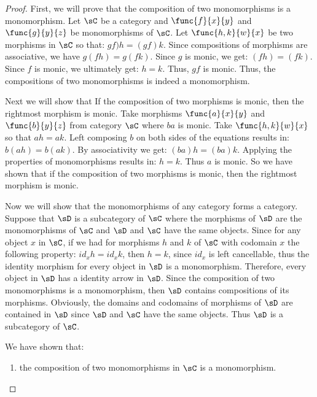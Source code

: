 \documentclass[main.tex]{subfiles}
\begin{document}
\begin{proof}
	First, we will prove that the composition of two monomorphisms is a
	monomorphism. Let \(\sC\) be a category and \(\func{f}{x}{y}\) and
	\(\func{g}{y}{z}\) be monomorphisms of \(\sC\). Let \(\func{h,k}{w}{x}\) be
	two morphisms in \(\sC\) so that: \(gf)h=(gf)k\). Since compositions of
	morphisms are associative, we have \(g(fh)=g(fk)\). Since \(g\) is monic, we
	get: \((fh)=(fk)\). Since \(f\) is monic, we ultimately get: \(h=k\). Thus,
	\(gf\) is monic. Thus, the compositions of two monomorphisms is indeed a
	monomorphism.

	Next we will show that If the composition of two morphisms is monic, then
	the rightmost morphism is monic. Take morphisms \(\func{a}{x}{y}\) and
	\(\func{b}{y}{z}\) from category \(\sC\) where \(ba\) is monic. Take
	\(\func{h,k}{w}{x}\) so that \(ah=ak\). Left composing \(b\) on both sides
	of the equations results in: \(b(ah)=b(ak)\). By associativity we get:
	\((ba)h=(ba)k\). Applying the properties of monomorphisms results in:
	\(h=k\). Thus \(a\) is monic. So we have shown that if the composition of two
	morphisms is monic, then the rightmost morphism is monic.

	Now we will show that the monomorphisms of any category forms a category.
	Suppose that \(\sD\) is a subcategory of \(\sC\) where the morphisms of
	\(\sD\) are the monomorphisms of \(\sC\) and \(\sD\) and \(\sC\) have the
	same objects. Since for any object \(x\) in \(\sC\), if we had for morphisms
	\(h\) and \(k\) of \(\sC\) with codomain \(x\) the following property:
	\(id_{x}h=id_{x}k\), then \(h=k\), since \(id_{x}\) is left cancellable,
	thus the identity morphism for every object in \(\sD\) is a monomorphism.
	Therefore, every object in \(\sD\) has a identity arrow in \(\sD\). Since
	the composition of two monomorphisms is a monomorphism, then \(\sD\)
	contains compositions of its morphisms. Obviously, the domains and codomains
	of morphisms of \(\sD\) are contained in \(\sD\) since \(\sD\) and \(\sC\)
	have the same objects. Thus \(\sD\) is a subcategory of \(\sC\).

	We have shown that:
	\begin{enumerate}
		\item the composition of two monomorphisms in \(\sC\) is a monomorphism.


\end{enumerate}
\end{proof}
\end{document}
